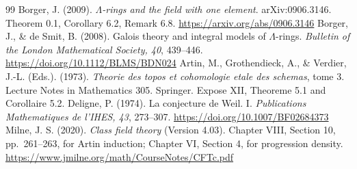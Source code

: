 \documentclass[11pt]{article}
\theoremstyle{remark}\newtheorem{remark}[theorem]{Remark}
\begin{document}
\begin{thebibliography}{99}
 Borger, J. (2009). \emph{$\Lambda$-rings and the field with one element}. arXiv:0906.3146. Theorem 0.1, Corollary 6.2, Remark 6.8. \url{https://arxiv.org/abs/0906.3146}
 Borger, J., \& de Smit, B. (2008). Galois theory and integral models of $\Lambda$-rings. \emph{Bulletin of the London Mathematical Society, 40}, 439--446. \url{https://doi.org/10.1112/BLMS/BDN024}
 Artin, M., Grothendieck, A., \& Verdier, J.-L. (Eds.). (1973). \emph{Theorie des topos et cohomologie etale des schemas}, tome 3. Lecture Notes in Mathematics 305. Springer. Expose XII, Theoreme 5.1 and Corollaire 5.2.
 Deligne, P. (1974). La conjecture de Weil. I. \emph{Publications Mathematiques de l'IHES, 43}, 273--307. \url{https://doi.org/10.1007/BF02684373}
 Milne, J. S. (2020). \emph{Class field theory} (Version 4.03). Chapter VIII, Section 10, pp.~261--263, for Artin induction; Chapter VI, Section 4, for progression density. \url{https://www.jmilne.org/math/CourseNotes/CFTc.pdf}
\end{thebibliography}
\end{document}
